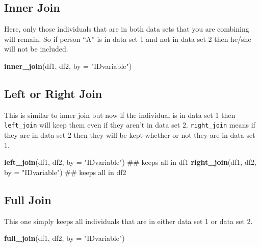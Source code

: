 \documentclass[]{tufte-book}
\newenvironment{Shaded}{}{}
\newcommand{\KeywordTok}[1]{\textcolor[rgb]{0.00,0.44,0.13}{\textbf{#1}}}
\newcommand{\DataTypeTok}[1]{\textcolor[rgb]{0.56,0.13,0.00}{#1}}
\newcommand{\StringTok}[1]{\textcolor[rgb]{0.25,0.44,0.63}{#1}}
\newcommand{\NormalTok}[1]{#1}
\theoremstyle{definition}
\theoremstyle{definition}
\theoremstyle{remark}
\begin{document}
\subsection*{Inner Join}\label{inner-join}

Here, only those individuals that are in both data sets that you are
combining will remain. So if person ``A'' is in data set 1 and not in
data set 2 then he/she will not be included.

\begin{Shaded}
\begin{Highlighting}[]
\KeywordTok{inner_join}\NormalTok{(df1, df2, }\DataTypeTok{by =} \StringTok{"IDvariable"}\NormalTok{)}
\end{Highlighting}
\end{Shaded}

\subsection*{Left or Right Join}\label{left-or-right-join}

This is similar to inner join but now if the individual is in data set 1
then \texttt{left\_join} will keep them even if they aren't in data set
2. \texttt{right\_join} means if they are in data set 2 then they will
be kept whether or not they are in data set 1.

\begin{Shaded}
\begin{Highlighting}[]
\KeywordTok{left_join}\NormalTok{(df1, df2, }\DataTypeTok{by =} \StringTok{"IDvariable"}\NormalTok{)  ## keeps all in df1}
\KeywordTok{right_join}\NormalTok{(df1, df2, }\DataTypeTok{by =} \StringTok{"IDvariable"}\NormalTok{)  ## keeps all in df2}
\end{Highlighting}
\end{Shaded}

\subsection*{Full Join}\label{full-join}

This one simply keeps all individuals that are in either data set 1 or
data set 2.

\begin{Shaded}
\begin{Highlighting}[]
\KeywordTok{full_join}\NormalTok{(df1, df2, }\DataTypeTok{by =} \StringTok{"IDvariable"}\NormalTok{)}
\end{Highlighting}
\end{Shaded}
\end{document}
